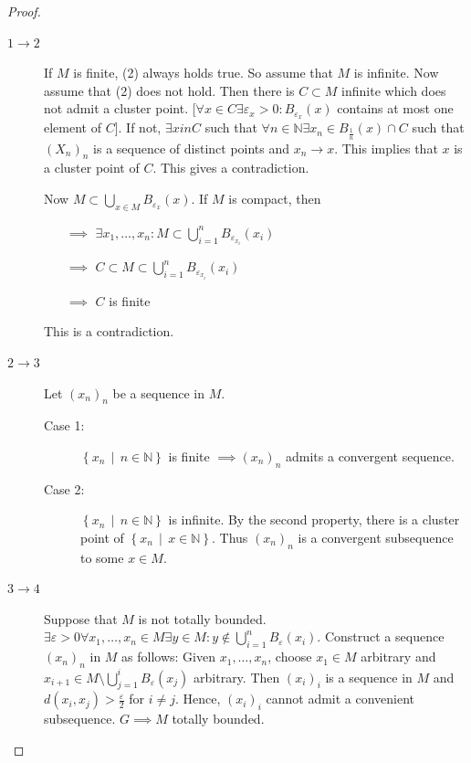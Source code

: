 \documentclass[a4paper]{article}
\numberwithin{lecref}{section}
\newcommand{\SetDef}[2]{\left\{#1\,\mid\,#2\right\}}
\begin{document}
\begin{proof}
	\begin{description}
		\item[$1 \to 2$]
			If $M$ is finite, (2) always holds true.
			So assume that $M$ is infinite. Now assume that (2) does not hold.
			Then there is $C \subset M$ infinite which does not admit a cluster point.
			[$\forall x \in C \exists \varepsilon_x > 0: B_{\varepsilon_x}(x)$ contains at most one element of $C$].
			If not, $\exists x in C$ such that $\forall n \in \mathbb N \exists x_n \in B_{\frac1n}(x) \cap C$ such that $(X_n)_n$ is a sequence of distinct points and $x_n \to x$.
			This implies that $x$ is a cluster point of $C$. This gives a contradiction.

			Now $M \subset \bigcup_{x \in M} B_{\varepsilon_x}(x)$. If $M$ is compact, then
			\begin{enumerate}
				\item[$\implies$] $\exists x_1, \dots, x_n: M \subset \bigcup_{i=1}^n B_{\varepsilon_{x_i}}(x_i)$
				\item[$\implies$] $C \subset M \subset \bigcup_{i=1}^n B_{\varepsilon_{x_i}}(x_i)$
				\item[$\implies$] $C$ is finite
			\end{enumerate}
			This is a contradiction.
		\item[$2 \to 3$]
			Let $(x_n)_n$ be a sequence in $M$.
			\begin{description}
				\item[Case 1:]
					$\SetDef{x_n}{n \in \mathbb N}$ is finite $\implies (x_n)_n$ admits a convergent sequence.
				\item[Case 2:]
					$\SetDef{x_n}{n \in \mathbb N}$ is infinite.
					By the second property, there is a cluster point of $\SetDef{x_n}{x \in \mathbb N}$.
					Thus $(x_n)_n$ is a convergent subsequence to some $x \in M$.
			\end{description}
		\item[$3 \to 4$]
			Suppose that $M$ is not totally bounded. $\exists \varepsilon > 0 \forall x_1, \dots, x_n \in M \exists y \in M: y \not\in \bigcup_{i = 1}^n B_{\varepsilon}(x_i)$.
			Construct a sequence $(x_n)_n$ in $M$ as follows:
			Given $x_1, \dots, x_n$, choose $x_1 \in M$ arbitrary and $x_{i+1} \in M \setminus \bigcup_{j=1}^i B_{\varepsilon}(x_j)$ arbitrary.
			Then $(x_i)_i$ is a sequence in $M$ and $d(x_i, x_j) > \frac\varepsilon2$ for $i \neq j$.
			Hence, $(x_i)_i$ cannot admit a convenient subsequence. $G \implies M$ totally bounded. %


\end{description}
\end{proof}
\end{document}
